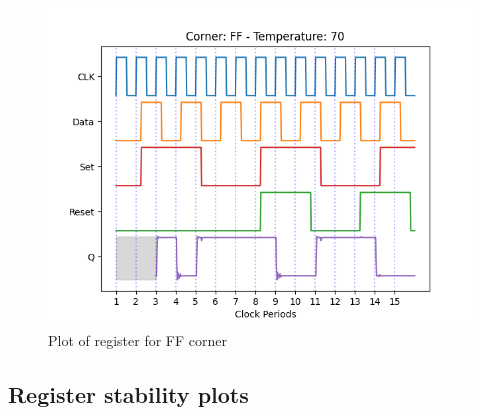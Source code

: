 \begin{figure}[H]
    \centering
    \begin{minipage}{0.5\textwidth}
        \centering
        \includegraphics[width=\textwidth]{Figures/Aimspice_Plots/FF_70.png}
        \caption{Plot of register for FF corner}
        \label{fig:FF70}
    \end{minipage}%
\end{figure}


\subsection{Register stability plots}
\label{appendix:register_stability}

